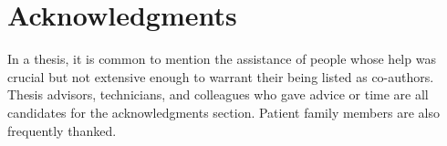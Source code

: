 
\chapter*{Acknowledgments}

In a thesis, it is common to mention the assistance of
people whose help was crucial but not extensive enough to warrant
their being listed as co-authors. Thesis advisors, technicians, and
colleagues  who gave advice or time are all candidates for the
acknowledgments section. Patient family members are also frequently thanked.

